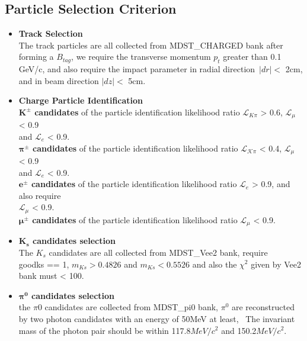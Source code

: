 \subsection{Particle Selection Criterion}
\begin{itemize}[leftmargin=*]
\item \textbf{Track Selection}\\
The track particles are all collected from MDST\_CHARGED bank after forming a $B_{tag}$, we require the transverse momentum $p_t$ greater than 0.1 GeV/c, and also require the impact parameter in radial direction\
$|dr| <$ 2cm, and in beam direction $|dz| <$ 5cm.
\item \textbf{Charge Particle Identification}\\
\textbf{$\bm{K^\pm}$ candidates} of the particle identification likelihood ratio $\mathcal{L}_{ K \pi}$ > 0.6,  $\mathcal{L_{\mu}}$ < 0.9\\
and  $\mathcal{L}_{e}$ < 0.9. \\
\textbf{$\bm{\pi^\pm}$ candidates} of the particle identification likelihood ratio $\mathcal{L_{ K \pi}}$ < 0.4,  $\mathcal{L_{\mu}}$ < 0.9\\
and  $\mathcal{L}_{e}$ < 0.9.\\
\textbf{$\bm{e^\pm}$ candidates} of the particle identification likelihood ratio $\mathcal{L}_{e}$ > 0.9, and also require \\
$\mathcal{L_{\mu}}$ < 0.9.\\
\textbf{$\bm{\mu^\pm}$ candidates} of the particle identification likelihood ratio $\mathcal{L_{\mu}}$ < 0.9.
\item \textbf{$\bm{K_s}$ candidates selection}\\
The $K_s$ candidates are all collected from MDST\_Vee2 bank, require \\ 
goodks == 1, $m_{Ks} > 0.4826$ and $m_{Ks} < 0.5526$ and also the $\chi ^2$ given by Vee2 bank must < 100.
\item \textbf{$\bm{\pi^0}$ candidates selection}\\ 
the $\pi0$ candidates are collected from MDST\_pi0 bank, $\pi^0$ are reconstructed by two photon candidates with an energy of 50MeV at least, \
The invariant mass of the photon pair should be within 117.8$MeV/c^2$ and 150.2$MeV/c^2$.



\end{itemize}
